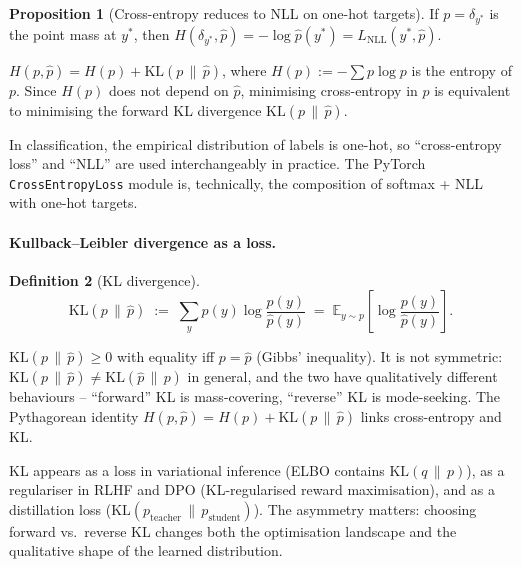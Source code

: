 \documentclass[11pt]{article}
\theoremstyle{definition}
\newtheorem{definition}{Definition}
\newtheorem{proposition}[definition]{Proposition}
\begin{document}
\begin{proposition}[Cross-entropy reduces to NLL on one-hot targets]
If $p = \delta_{y^{\ast}}$ is the point mass at $y^{\ast}$, then
\(
  H(\delta_{y^{\ast}}, \hat p) = -\log \hat p(y^{\ast}) = L_{\mathrm{NLL}}(y^{\ast}, \hat p).
\)
\end{proposition}

\begin{mathnote}
$H(p, \hat p) = H(p) + \mathrm{KL}(p \,\|\, \hat p)$, where $H(p) := -\sum
p \log p$ is the entropy of $p$. Since $H(p)$ does not depend on $\hat p$,
minimising cross-entropy in $\hat p$ is equivalent to minimising the
forward KL divergence $\mathrm{KL}(p \,\|\, \hat p)$.
\end{mathnote}

\begin{mlnote}
In classification, the empirical distribution of labels is one-hot, so
``cross-entropy loss'' and ``NLL'' are used interchangeably in practice.
The PyTorch \texttt{CrossEntropyLoss} module is, technically, the
composition of softmax + NLL with one-hot targets.
\end{mlnote}

\paragraph{Kullback--Leibler divergence as a loss.}

\begin{definition}[KL divergence]
\[
  \mathrm{KL}(p \,\|\, \hat p) \;:=\; \sum_{y} p(y) \log \frac{p(y)}{\hat p(y)}
  \;=\; \mathbb{E}_{y \sim p}\!\left[\log \frac{p(y)}{\hat p(y)}\right].
\]
\end{definition}

\begin{mathnote}
$\mathrm{KL}(p \,\|\, \hat p) \geq 0$ with equality iff $p = \hat p$
(Gibbs' inequality). It is not symmetric:
$\mathrm{KL}(p \,\|\, \hat p) \neq \mathrm{KL}(\hat p \,\|\, p)$ in general,
and the two have qualitatively different behaviours -- ``forward'' KL is
mass-covering, ``reverse'' KL is mode-seeking. The Pythagorean identity
$H(p, \hat p) = H(p) + \mathrm{KL}(p \,\|\, \hat p)$ links cross-entropy
and KL.
\end{mathnote}

\begin{mlnote}
KL appears as a loss in variational inference (ELBO contains
$\mathrm{KL}(q \,\|\, p)$), as a regulariser in RLHF and DPO
(KL-regularised reward maximisation), and as a distillation loss
($\mathrm{KL}(p_{\mathrm{teacher}} \,\|\, p_{\mathrm{student}})$). The
asymmetry matters: choosing forward vs.\ reverse KL changes both the
optimisation landscape and the qualitative shape of the learned distribution.
\end{mlnote}
\end{document}
